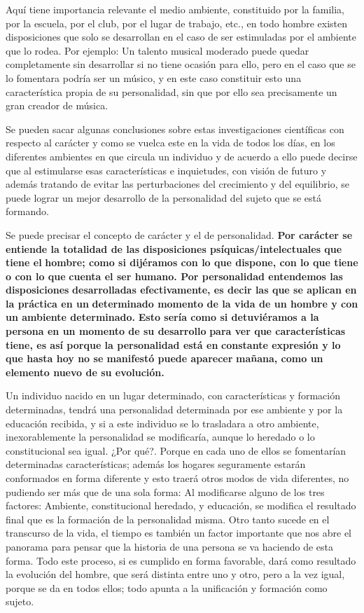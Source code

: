 Aquí tiene importancia relevante el medio ambiente, constituido por la familia, por la escuela, por el club, por el lugar de trabajo, etc., en todo hombre existen disposiciones que solo se desarrollan en el caso de ser estimuladas por el ambiente que lo rodea. Por ejemplo: Un talento musical moderado puede quedar completamente sin desarrollar si no tiene ocasión para ello, pero en el caso que se lo fomentara podría ser un músico, y en este caso constituir esto una característica propia de su personalidad, sin que por ello sea precisamente un gran creador de música.

Se pueden sacar algunas conclusiones sobre estas investigaciones científicas con respecto al carácter y como se vuelca este en la vida de todos los días, en los diferentes ambientes en que circula un individuo y de acuerdo a ello puede decirse que al estimularse esas características e inquietudes, con visión de futuro y además tratando de evitar las perturbaciones del crecimiento y del equilibrio, se puede lograr un mejor desarrollo de la personalidad del sujeto que se está formando.

Se puede precisar el concepto de carácter y el de personalidad. \textbf{Por carácter se} \textbf{entiende la totalidad de las disposiciones psíquicas/intelectuales que tiene el} \textbf{hombre; como si dijéramos con lo que dispone, con lo que tiene o con lo que} \textbf{cuenta el ser humano. Por personalidad entendemos las disposiciones} \textbf{desarrolladas efectivamente, es decir las que se aplican en la práctica en un} \textbf{determinado momento de la vida de un hombre y con un ambiente determinado.} \textbf{Esto sería como si detuviéramos a la persona en un momento de su desarrollo} \textbf{para ver que características tiene, es así porque la personalidad está en} \textbf{constante expresión y lo que hasta hoy no se manifestó puede aparecer} \textbf{mañana, como un elemento nuevo de su evolución.}



Un individuo nacido en un lugar determinado, con características y formación determinadas, tendrá una personalidad determinada por ese ambiente y por la educación recibida, y si a este individuo se lo trasladara a otro ambiente, inexorablemente la personalidad se modificaría, aunque lo heredado o lo constitucional sea igual. ¿Por qué?. Porque en cada uno de ellos se fomentarían determinadas características; además los hogares seguramente estarán conformados en forma diferente y esto traerá otros modos de vida diferentes, no pudiendo ser más que de una sola forma: Al modificarse alguno de los tres factores: Ambiente, constitucional heredado, y educación, se modifica el resultado final que es la formación de la personalidad misma. Otro tanto sucede en el transcurso de la vida, el tiempo es también un factor importante que nos abre el panorama para pensar que la historia de una persona se va haciendo de esta forma. Todo este proceso, si es cumplido en forma favorable, dará como resultado la evolución del hombre, que será distinta entre uno y otro, pero a la vez igual, porque se da en todos ellos; todo apunta a la unificación y formación como sujeto.

